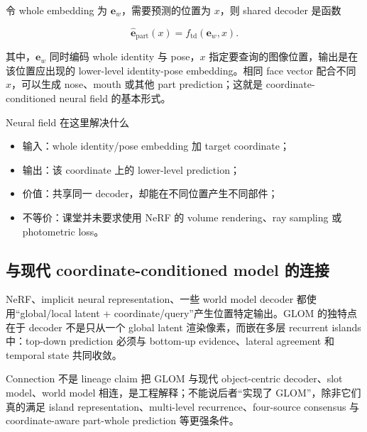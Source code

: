 \documentclass[a4paper]{article}
\begin{document}
令 whole embedding 为 $\mathbf e_w$，需要预测的位置为 $x$，则 shared decoder 是函数

\[
\hat{\mathbf e}_{\mathrm{part}}(x)=f_{\mathrm{td}}\!\left(\mathbf e_w,x\right).
\]

其中，$\mathbf e_w$ 同时编码 whole identity 与 pose，$x$ 指定要查询的图像位置，输出是在该位置应出现的 lower-level identity-pose embedding。相同 face vector 配合不同 $x$，可以生成 nose、mouth 或其他 part prediction；这就是 coordinate-conditioned neural field 的基本形式。


\begin{knowledgebox}{Neural field 在这里解决什么}
\begin{itemize}
  \item 输入：whole identity/pose embedding 加 target coordinate；
  \item 输出：该 coordinate 上的 lower-level prediction；
  \item 价值：共享同一 decoder，却能在不同位置产生不同部件；
  \item 不等价：课堂并未要求使用 NeRF 的 volume rendering、ray sampling 或 photometric loss。
\end{itemize}
\end{knowledgebox}

\subsection{与现代 coordinate-conditioned model 的连接}

NeRF、implicit neural representation、一些 world model decoder 都使用“global/local latent + coordinate/query”产生位置特定输出。GLOM 的独特点在于 decoder 不是只从一个 global latent 渲染像素，而嵌在多层 recurrent islands 中：top-down prediction 必须与 bottom-up evidence、lateral agreement 和 temporal state 共同收敛。

\begin{warningbox}{Connection 不是 lineage claim}
把 GLOM 与现代 object-centric decoder、slot model、world model 相连，是工程解释；不能说后者“实现了 GLOM”，除非它们真的满足 island representation、multi-level recurrence、four-source consensus 与 coordinate-aware part-whole prediction 等更强条件。
\end{warningbox}
\end{document}
